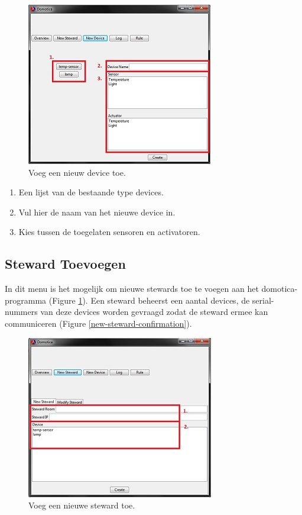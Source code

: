 \documentclass{article}
\begin{document}
		\newpage
		\begin{figure}
			\begin{center}
				\includegraphics{../screenshot/new-device.jpg}
			\end{center}
			\caption{Voeg een nieuw device toe.}
		\end{figure}
	
		\begin{enumerate}
			\item Een lijst van de bestaande type devices.
			\item Vul hier de naam van het nieuwe device in.
			\item Kies tussen de toegelaten sensoren en activatoren.
		\end{enumerate}
	
		\subsection{Steward Toevoegen}
		\label{add-steward}
	In dit menu is het mogelijk om nieuwe stewards toe te voegen aan het domotica-programma (Figure \ref{new-steward}). Een steward beheerst een aantal devices, de serial-nummers van deze devices worden gevraagd zodat de steward ermee kan communiceren (Figure \ref{new-steward-confirmation}).
	
		\newpage
		\begin{figure}
			\begin{center}
				\includegraphics{../screenshot/new-steward.jpg}
			\end{center}
			\caption{Voeg een nieuwe steward toe.}
			\label{new-steward}
		\end{figure}
	
\end{document}
